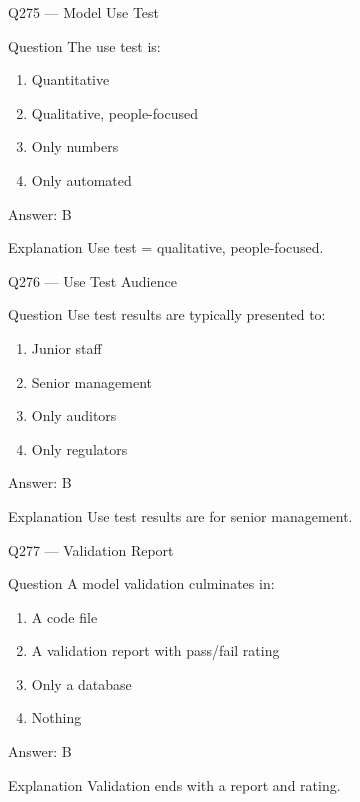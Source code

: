 \documentclass[aspectratio=169,8pt]{beamer}
\begin{document}
								\begin{frame}{Q275 --- Model Use Test}
									\begin{block}{Question}
										The use test is:
										\begin{enumerate}
											\item Quantitative
											\item Qualitative, people-focused
											\item Only numbers
											\item Only automated
										\end{enumerate}
									\end{block}
									\begin{exampleblock}{Answer: B}\end{exampleblock}
									\begin{block}{Explanation}
										Use test = qualitative, people-focused.
									\end{block}
								\end{frame}
								
								\begin{frame}{Q276 --- Use Test Audience}
									\begin{block}{Question}
										Use test results are typically presented to:
										\begin{enumerate}
											\item Junior staff
											\item Senior management
											\item Only auditors
											\item Only regulators
										\end{enumerate}
									\end{block}
									\begin{exampleblock}{Answer: B}\end{exampleblock}
									\begin{block}{Explanation}
										Use test results are for senior management.
									\end{block}
								\end{frame}
								
								\begin{frame}{Q277 --- Validation Report}
									\begin{block}{Question}
										A model validation culminates in:
										\begin{enumerate}
											\item A code file
											\item A validation report with pass/fail rating
											\item Only a database
											\item Nothing
										\end{enumerate}
									\end{block}
									\begin{exampleblock}{Answer: B}\end{exampleblock}
									\begin{block}{Explanation}
										Validation ends with a report and rating.
									\end{block}
								\end{frame}
								
\end{document}
